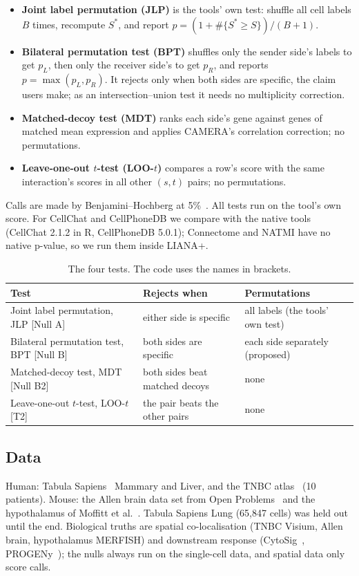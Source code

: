 \documentclass[11pt]{article}
\newcommand{\JLP}{JLP}
\newcommand{\BPT}{BPT}
\newcommand{\MDT}{MDT}
\newcommand{\LOO}{LOO-$t$}
\begin{document}
\begin{itemize}\setlength{\itemsep}{1pt}
\item \textbf{Joint label permutation (\JLP)} is the tools' own test: shuffle all cell labels $B$ times, recompute
$S^*$, and report $p=(1+\#\{S^*\ge S\})/(B+1)$.
\item \textbf{Bilateral permutation test (\BPT)} shuffles only the sender side's labels to get $p_L$, then only the
receiver side's to get $p_R$, and reports $p=\max(p_L,p_R)$. It rejects only when both sides are specific, the claim
users make; as an intersection--union test it needs no multiplicity correction.
\item \textbf{Matched-decoy test (\MDT)} ranks each side's gene against genes of matched mean expression and applies
CAMERA's correlation correction; no permutations.
\item \textbf{Leave-one-out $t$-test (\LOO)} compares a row's score with the same interaction's scores in all other
$(s,t)$ pairs; no permutations.
\end{itemize}
Calls are made by Benjamini--Hochberg at 5\%~\cite{bh1995}. All tests run on the tool's own score. For CellChat and
CellPhoneDB we compare with the native tools (CellChat 2.1.2 in R, CellPhoneDB 5.0.1); Connectome and NATMI have no
native p-value, so we run them inside LIANA+.

\begin{table}[H]
\centering\small\setlength{\tabcolsep}{3pt}
\caption{The four tests. The code uses the names in brackets.}
\label{tab:names}
\begin{tabular}{@{}lll@{}}
\toprule
Test & Rejects when & Permutations\\
\midrule
Joint label permutation, \JLP{} [Null A] & either side is specific & all labels (the tools' own test)\\
Bilateral permutation test, \BPT{} [Null B] & both sides are specific & each side separately (proposed)\\
Matched-decoy test, \MDT{} [Null B2] & both sides beat matched decoys & none\\
Leave-one-out $t$-test, \LOO{} [T2] & the pair beats the other pairs & none\\
\bottomrule
\end{tabular}
\end{table}

\subsection{Data}
Human: Tabula Sapiens~\cite{tabula2022} Mammary and Liver, and the TNBC atlas~\cite{wu2021} (10 patients). Mouse:
the Allen brain data set from Open Problems~\cite{openproblems} and the hypothalamus of Moffitt et
al.~\cite{moffitt2018}. Tabula Sapiens Lung (65{,}847 cells) was held out until the end. Biological truths are spatial
co-localisation (TNBC Visium, Allen brain, hypothalamus MERFISH) and downstream response
(CytoSig~\cite{jiang2021}, PROGENy~\cite{schubert2018}); the nulls always run on the single-cell data, and spatial data
only score calls.
\end{document}
